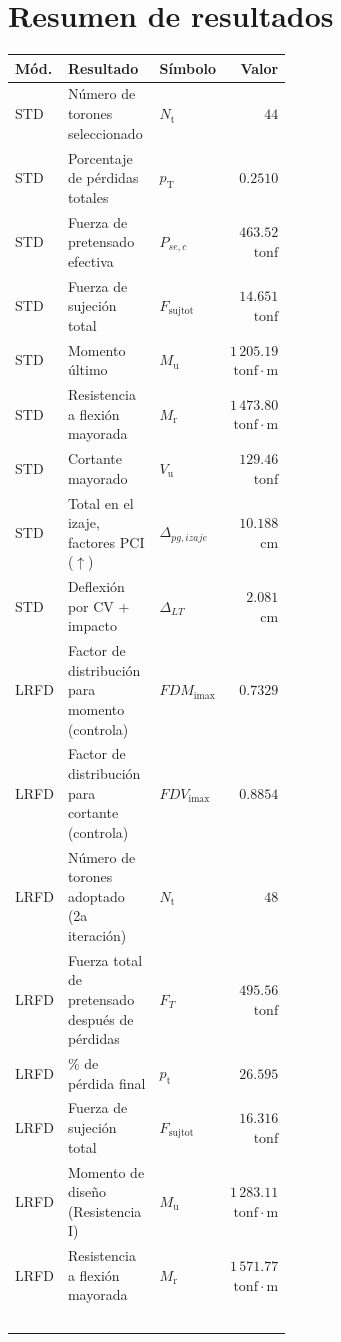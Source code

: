 \documentclass[10pt,a4paper]{article}
\begin{document}
\section*{Resumen de resultados}
\begin{longtable}{@{}l p{0.55\linewidth} l r@{}}
\toprule
\textbf{Mód.} & \textbf{Resultado} & \textbf{Símbolo} & \textbf{Valor}\\
\midrule
\endhead
STD & Número de torones seleccionado & $N_{\mathrm{t}}$ & $44$ \\
STD & Porcentaje de pérdidas totales & $p_{\mathrm{T}}$ & $0.2510$ \\
STD & Fuerza de pretensado efectiva & $P_{se,c}$ & $463.52$$\,\mathrm{tonf}$ \\
STD & Fuerza de sujeción total & $F_{\mathrm{sujtot}}$ & $14.651$$\,\mathrm{tonf}$ \\
STD & Momento último & $M_{\mathrm{u}}$ & $1\,205.19$$\,\mathrm{tonf\cdot m}$ \\
STD & Resistencia a flexión mayorada & $M_{\mathrm{r}}$ & $1\,473.80$$\,\mathrm{tonf\cdot m}$ \\
STD & Cortante mayorado & $V_{\mathrm{u}}$ & $129.46$$\,\mathrm{tonf}$ \\
STD & Total en el izaje, factores PCI ($\uparrow$) & $\Delta_{pg,izaje}$ & $10.188$$\,\mathrm{cm}$ \\
STD & Deflexión por CV + impacto & $\Delta_{LT}$ & $2.081$$\,\mathrm{cm}$ \\
LRFD & Factor de distribución para momento (controla) & $\mathit{FDM}_{\mathrm{imax}}$ & $0.7329$ \\
LRFD & Factor de distribución para cortante (controla) & $\mathit{FDV}_{\mathrm{imax}}$ & $0.8854$ \\
LRFD & Número de torones adoptado (2a iteración) & $N_{\mathrm{t}}$ & $48$ \\
LRFD & Fuerza total de pretensado después de pérdidas & $F_T$ & $495.56$$\,\mathrm{tonf}$ \\
LRFD & \% de pérdida final & $p_{\mathrm{t}}$ & $26.595$ \\
LRFD & Fuerza de sujeción total & $F_{\mathrm{sujtot}}$ & $16.316$$\,\mathrm{tonf}$ \\
LRFD & Momento de diseño (Resistencia I) & $M_{\mathrm{u}}$ & $1\,283.11$$\,\mathrm{tonf\cdot m}$ \\
LRFD & Resistencia a flexión mayorada & $M_{\mathrm{r}}$ & $1\,571.77$$\,\mathrm{tonf\cdot m}$ \\
$$
\end{longtable}
\end{document}
